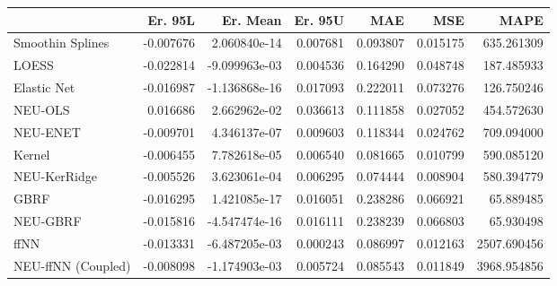 \begin{tabular}{lrrrrrr}
\toprule
{} &   Er. 95L &      Er. Mean &   Er. 95U &       MAE &       MSE &         MAPE \\
\midrule
Smoothin Splines   & -0.007676 &  2.060840e-14 &  0.007681 &  0.093807 &  0.015175 &   635.261309 \\
LOESS              & -0.022814 & -9.099963e-03 &  0.004536 &  0.164290 &  0.048748 &   187.485933 \\
Elastic Net        & -0.016987 & -1.136868e-16 &  0.017093 &  0.222011 &  0.073276 &   126.750246 \\
NEU-OLS            &  0.016686 &  2.662962e-02 &  0.036613 &  0.111858 &  0.027052 &   454.572630 \\
NEU-ENET           & -0.009701 &  4.346137e-07 &  0.009603 &  0.118344 &  0.024762 &   709.094000 \\
Kernel             & -0.006455 &  7.782618e-05 &  0.006540 &  0.081665 &  0.010799 &   590.085120 \\
NEU-KerRidge       & -0.005526 &  3.623061e-04 &  0.006295 &  0.074444 &  0.008904 &   580.394779 \\
GBRF               & -0.016295 &  1.421085e-17 &  0.016051 &  0.238286 &  0.066921 &    65.889485 \\
NEU-GBRF           & -0.015816 & -4.547474e-16 &  0.016111 &  0.238239 &  0.066803 &    65.930498 \\
ffNN               & -0.013331 & -6.487205e-03 &  0.000243 &  0.086997 &  0.012163 &  2507.690456 \\
NEU-ffNN (Coupled) & -0.008098 & -1.174903e-03 &  0.005724 &  0.085543 &  0.011849 &  3968.954856 \\
\bottomrule
\end{tabular}
